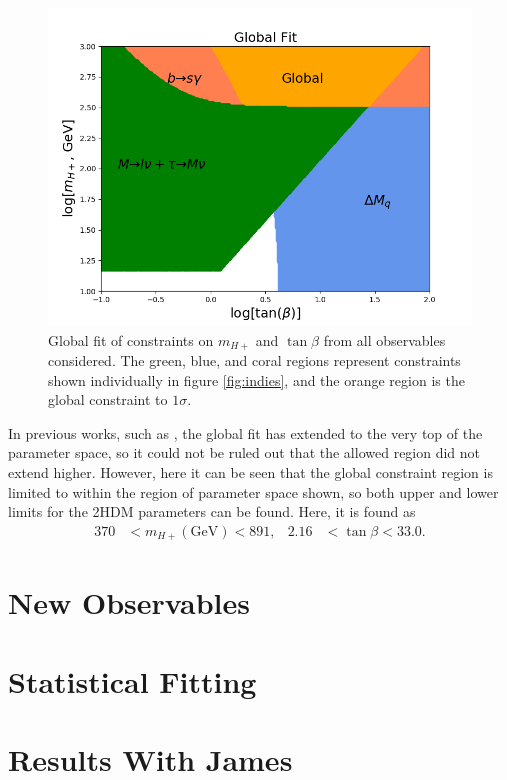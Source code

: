 \documentclass[a4paper,12pt]{article}
\begin{document}
\begin{figure}[ht]
    \vspace{-20pt}
    \centering
    \includegraphics[scale=0.55]{global.png}
    \caption{\label{fig:glob} Global fit of constraints on $m_{H+}$ and $\tan\beta$ from all observables considered. The green, blue, and coral regions represent constraints shown individually in figure \ref{fig:indies}, and the orange region is the global constraint to $1\sigma$.}
\end{figure}
In previous works, such as \cite{a}, the global fit has extended to the very top of the parameter space, so it could not be ruled out that the allowed region did not extend higher. 
However, here it can be seen that the global constraint region is limited to within the region of parameter space shown, so both upper and lower limits for the 2HDM parameters can be found.
Here, it is found as
\begin{align}
    \label{eq:const}
    370 &< m_{H+} (\text{GeV}) < 891, & 2.16 &< \tan\beta < 33.0.
\end{align}

\section{New Observables}

\section{Statistical Fitting}

\section{Results With James}
\end{document}
